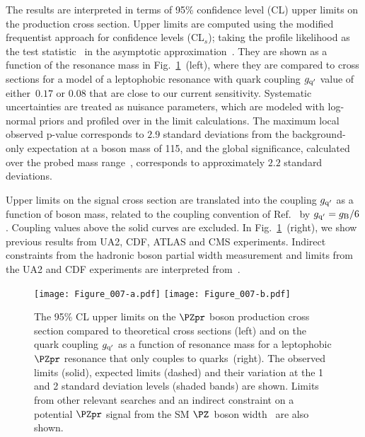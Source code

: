 \documentclass[11pt,twoside,a4paper,cmspaper,final,collab]{cms-tdr}
\begin{document}
The results are
interpreted in terms of 95\% confidence level (CL) upper limits on the production cross
section. Upper limits are computed using the modified frequentist
approach for confidence levels (CL$_s$); taking the profile likelihood as
the test statistic~\cite{CLS2,CLS1} in the asymptotic approximation~\cite{Cowan:2010js}.
They are shown as a function of the resonance mass in Fig.~\ref{fig:limits}~(left), where
they are compared to cross sections for 
a model of a leptophobic \PZpr resonance with 
quark coupling $g_{\rm q^\prime}$ value of either~$0.17$ or $0.08$ that are close to our current sensitivity.
Systematic uncertainties are treated as nuisance
parameters, which are modeled with log-normal priors 
and profiled over in the limit calculations.
The maximum local observed $\text{p}$-value corresponds to $2.9$ standard deviations from the
background-only expectation at a \PZpr boson mass of 115\GeV, and the global significance,
calculated over the probed mass range~\cite{Gross:2010qma},
corresponds to approximately $2.2$ standard deviations.

Upper limits on the signal cross section are translated into the coupling $g_{\rm q^{\prime}}$ as a function of \PZpr boson mass, 
related to the \PZpr coupling convention of Ref.~\cite{Dobrescu:2013coa} by 
$g_{\rm q^{\prime}} = g_{\rm B}/6$.
Coupling values above the solid curves are excluded. In Fig.~\ref{fig:limits}~(right), we show previous results
from UA2, CDF, ATLAS and CMS experiments.  Indirect constraints from the
hadronic \PZ boson partial width measurement and limits from the UA2 and CDF experiments are interpreted
from~\cite{Dobrescu:2013coa}.  

\begin{figure}[hbtp]
\begin{center}
\texttt{[image: Figure\_007-a.pdf]} \hfil
\texttt{[image: Figure\_007-b.pdf]}
\caption{
The 95\% CL upper limits on the $\PZpr$ boson production cross section compared to theoretical cross sections (left) and
on the quark coupling $g_{\rm q^{\prime}}$ as a function of resonance mass for a leptophobic $\PZpr$ resonance that only couples to quarks~(right).
The observed limits (solid), expected limits (dashed) and their variation at the 1 and 2 standard deviation levels (shaded bands) are shown.
Limits from other relevant searches and an indirect constraint on a potential $\PZpr$ signal from the SM $\PZ$~boson width~\cite{Dobrescu:2014fca} are also shown. 
\label{fig:limits}    
}
\end{center}
\end{figure}
\end{document}
